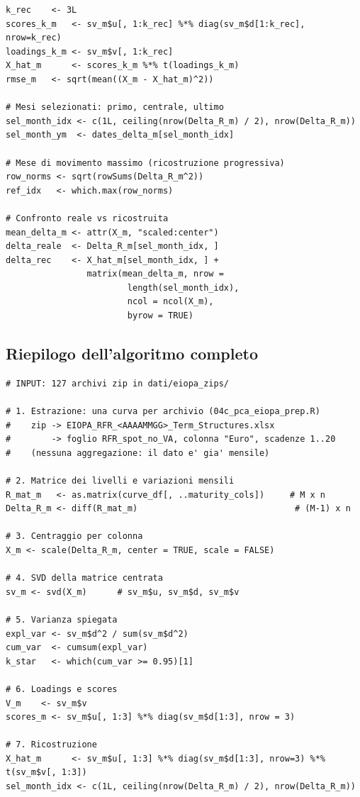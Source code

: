 \documentclass[11pt,a4paper]{article}
\theoremstyle{plain}
\theoremstyle{definition}
\theoremstyle{remark}
\begin{document}
\begin{codebox}
\begin{Verbatim}[fontsize=\small]
k_rec    <- 3L
scores_k_m   <- sv_m$u[, 1:k_rec] %*% diag(sv_m$d[1:k_rec], nrow=k_rec)
loadings_k_m <- sv_m$v[, 1:k_rec]
X_hat_m      <- scores_k_m %*% t(loadings_k_m)
rmse_m   <- sqrt(mean((X_m - X_hat_m)^2))

# Mesi selezionati: primo, centrale, ultimo
sel_month_idx <- c(1L, ceiling(nrow(Delta_R_m) / 2), nrow(Delta_R_m))
sel_month_ym  <- dates_delta_m[sel_month_idx]

# Mese di movimento massimo (ricostruzione progressiva)
row_norms <- sqrt(rowSums(Delta_R_m^2))
ref_idx   <- which.max(row_norms)

# Confronto reale vs ricostruita
mean_delta_m <- attr(X_m, "scaled:center")
delta_reale  <- Delta_R_m[sel_month_idx, ]
delta_rec    <- X_hat_m[sel_month_idx, ] +
                matrix(mean_delta_m, nrow =
                        length(sel_month_idx),
                        ncol = ncol(X_m),
                        byrow = TRUE)
\end{Verbatim}
\end{codebox}

\subsection{Riepilogo dell'algoritmo completo}

\begin{algobox}
\begin{Verbatim}[fontsize=\small]
# INPUT: 127 archivi zip in dati/eiopa_zips/

# 1. Estrazione: una curva per archivio (04c_pca_eiopa_prep.R)
#    zip -> EIOPA_RFR_<AAAAMMGG>_Term_Structures.xlsx
#        -> foglio RFR_spot_no_VA, colonna "Euro", scadenze 1..20
#    (nessuna aggregazione: il dato e' gia' mensile)

# 2. Matrice dei livelli e variazioni mensili
R_mat_m   <- as.matrix(curve_df[, ..maturity_cols])     # M x n
Delta_R_m <- diff(R_mat_m)                               # (M-1) x n

# 3. Centraggio per colonna
X_m <- scale(Delta_R_m, center = TRUE, scale = FALSE)

# 4. SVD della matrice centrata
sv_m <- svd(X_m)      # sv_m$u, sv_m$d, sv_m$v

# 5. Varianza spiegata
expl_var <- sv_m$d^2 / sum(sv_m$d^2)
cum_var  <- cumsum(expl_var)
k_star   <- which(cum_var >= 0.95)[1]

# 6. Loadings e scores
V_m    <- sv_m$v
scores_m <- sv_m$u[, 1:3] %*% diag(sv_m$d[1:3], nrow = 3)

# 7. Ricostruzione
X_hat_m      <- sv_m$u[, 1:3] %*% diag(sv_m$d[1:3], nrow=3) %*% t(sv_m$v[, 1:3])
sel_month_idx <- c(1L, ceiling(nrow(Delta_R_m) / 2), nrow(Delta_R_m))
\end{Verbatim}
\end{algobox}
\end{document}
